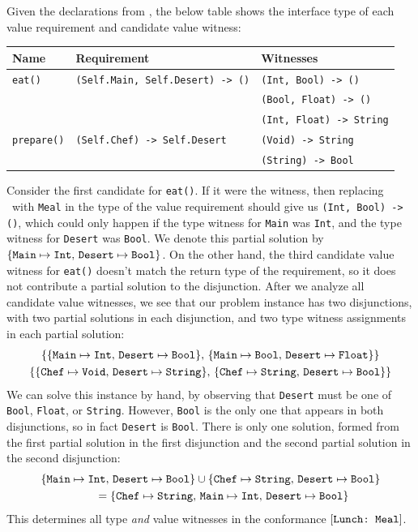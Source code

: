 \documentclass[../generics]{subfiles}
\begin{document}
\begin{example}\label{assoc type inference example 2}
Given the declarations from , the below table shows the interface type of each value requirement and candidate value witness:
\begin{center}
\begin{tabular}{lll}
\toprule
\textbf{Name}&\textbf{Requirement}&\textbf{Witnesses}\\
\midrule
\verb|eat()|&\verb|(Self.Main, Self.Desert) -> ()|&\verb|(Int, Bool) -> ()|\\
&&\verb|(Bool, Float) -> ()|\\
&&\verb|(Int, Float) -> String|\\
\midrule
\verb|prepare()|&\verb|(Self.Chef) -> Self.Desert|&\verb|(Void) -> String|\\
&&\verb|(String) -> Bool|\\
\bottomrule
\end{tabular}
\end{center}
Consider the first candidate for \verb|eat()|. If it were the witness, then replacing \tSelf\ with \texttt{Meal} in the type of the value requirement should give us \verb|(Int, Bool) -> ()|, which could only happen if the type witness for \texttt{Main} was \texttt{Int}, and the type witness for \texttt{Desert} was \texttt{Bool}. We denote this partial solution by $\{ \texttt{Main} \mapsto \texttt{Int},\, \texttt{Desert} \mapsto \texttt{Bool} \}$. On the other hand, the third candidate value witness for \verb|eat()| doesn't match the return type of the requirement, so it does not contribute a partial solution to the disjunction. After we analyze all candidate value witnesses, we see that our problem instance has two disjunctions, with two partial solutions in each disjunction, and two type witness assignments in each partial solution:
\begin{gather*}
\{\{ \texttt{Main} \mapsto \texttt{Int},\, \texttt{Desert} \mapsto \texttt{Bool} \},\,
\{ \texttt{Main} \mapsto \texttt{Bool},\, \texttt{Desert} \mapsto \texttt{Float} \}\}\\
\{\{ \texttt{Chef} \mapsto \texttt{Void},\, \texttt{Desert} \mapsto \texttt{String} \},\,
\{ \texttt{Chef} \mapsto \texttt{String},\, \texttt{Desert} \mapsto \texttt{Bool} \}\}
\end{gather*}
We can solve this instance by hand, by observing that \texttt{Desert} must be one of \texttt{Bool}, \texttt{Float}, or \texttt{String}. However, \texttt{Bool} is the only one that appears in both disjunctions, so in fact \texttt{Desert} is \texttt{Bool}. There is only one solution, formed from the first partial solution in the first disjunction and the second partial solution in the second disjunction:
\begin{gather*}
\{ \texttt{Main} \mapsto \texttt{Int},\, \texttt{Desert} \mapsto \texttt{Bool} \}
\cup
\{ \texttt{Chef} \mapsto \texttt{String},\, \texttt{Desert} \mapsto \texttt{Bool} \}\\
\qquad {} =
\{ \texttt{Chef} \mapsto \texttt{String},\, \texttt{Main} \mapsto \texttt{Int},\, \texttt{Desert} \mapsto \texttt{Bool} \}
\end{gather*}
This determines all type \emph{and} value witnesses in the conformance $[\texttt{Lunch:~Meal}]$.
\end{example}
\end{document}
